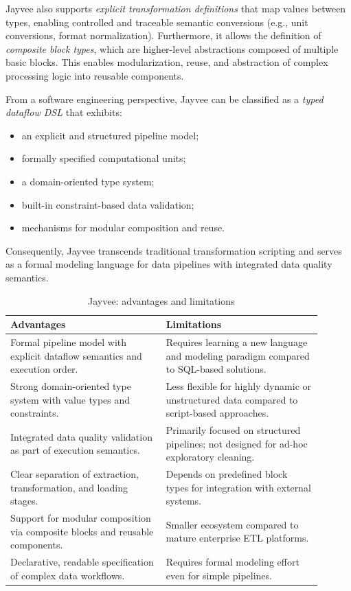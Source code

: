 Jayvee also supports \emph{explicit transformation definitions} that map values between types, enabling controlled and traceable semantic conversions (e.g., unit conversions, format normalization). 
Furthermore, it allows the definition of \emph{composite block types}, which are higher-level abstractions composed of multiple basic blocks. 
This enables modularization, reuse, and abstraction of complex processing logic into reusable components.

From a software engineering perspective, Jayvee can be classified as a \emph{typed dataflow DSL} that exhibits:
\begin{itemize}[label=-, noitemsep]
    \item an explicit and structured pipeline model;
    \item formally specified computational units;
    \item a domain-oriented type system;
    \item built-in constraint-based data validation;
    \item mechanisms for modular composition and reuse.
\end{itemize}
Consequently, Jayvee transcends traditional transformation scripting and serves as a formal modeling language for data pipelines with integrated data quality semantics.


\begin{table}[h]
\centering
\caption{Jayvee: advantages and limitations}
\begin{tabular}{|p{0.45\linewidth}| p{0.45\linewidth}|}
\hline
\textbf{Advantages} & \textbf{Limitations} \\
\hline
Formal pipeline model with explicit dataflow semantics and execution order. &
Requires learning a new language and modeling paradigm compared to SQL-based solutions. \\
\hline
Strong domain-oriented type system with value types and constraints. &
Less flexible for highly dynamic or unstructured data compared to script-based approaches. \\
\hline
Integrated data quality validation as part of execution semantics. &
Primarily focused on structured pipelines; not designed for ad-hoc exploratory cleaning. \\
\hline
Clear separation of extraction, transformation, and loading stages. &
Depends on predefined block types for integration with external systems. \\
\hline
Support for modular composition via composite blocks and reusable components. &
Smaller ecosystem compared to mature enterprise ETL platforms. \\
\hline
Declarative, readable specification of complex data workflows. &
Requires formal modeling effort even for simple pipelines. \\
\hline
\end{tabular}
\end{table}

